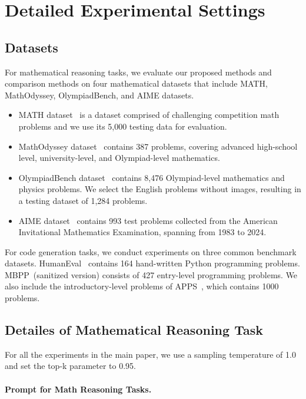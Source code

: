 \section{Detailed Experimental Settings}
\label{app:exp-details}

\subsection{Datasets}
\label{sec:datasets}
For mathematical reasoning tasks, we evaluate our proposed methods and comparison methods on four mathematical datasets that include MATH, MathOdyssey, OlympiadBench, and AIME datasets. 
\begin{itemize}
    \item MATH dataset~\citep{hendrycks2021math} is a dataset comprised of challenging competition math problems and we use its 5,000 testing data for evaluation. 
    \item MathOdyssey dataset~\citep{Fang24Odyssey} contains 387 problems, covering advanced high-school level, university-level, and Olympiad-level mathematics. 
    \item OlympiadBench dataset~\citep{He24OlympiadBench} contains 8,476 Olympiad-level mathematics and physics problems. We select the English problems without images, resulting in a testing dataset of 1,284 problems. 
    \item AIME dataset~\citep{AIME} contains 993 test problems collected from the American Invitational Mathematics Examination, spanning from 1983 to 2024.
\end{itemize}

For code generation tasks, we conduct experiments on three common benchmark datasets. 
HumanEval~\citep{Codex2021} contains 164 hand-written Python programming problems. 
MBPP~\citep{MBPP2021}(sanitized version) consists of 427 entry-level programming problems. 
We also include the introductory-level problems of APPS~\citep{APPS2021}, which contains 1000 problems.

\subsection{Detailes of Mathematical Reasoning Task}

For all the experiments in the main paper, we use a sampling temperature of 1.0 and set the top-k parameter to 0.95. 

\paragraph{Prompt for Math Reasoning Tasks.}


